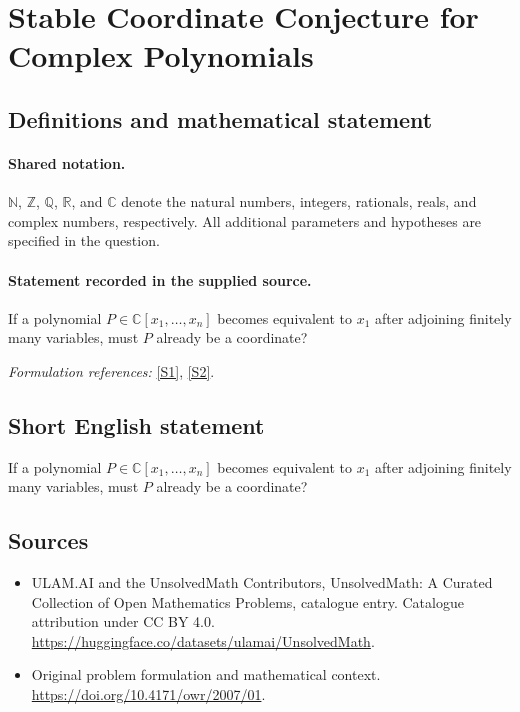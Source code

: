 \documentclass[11pt]{article}
\newcommand{\sref}[2]{\hyperlink{source:#1:#2}{[S#2]}}
\begin{document}
\section{Stable Coordinate Conjecture for Complex Polynomials}\label{statement}

\subsection{Definitions and mathematical statement}

\paragraph{Shared notation.}$\mathbb N$, $\mathbb Z$, $\mathbb Q$, $\mathbb R$, and $\mathbb C$ denote the natural numbers, integers, rationals, reals, and complex numbers, respectively. All additional parameters and hypotheses are specified in the question.


\paragraph{Statement recorded in the supplied source.}
If a polynomial $P\in\mathbb{C}[x_1,\ldots,x_n]$ becomes equivalent to $x_1$ after adjoining finitely many variables, must $P$ already be a coordinate?
\par\smallskip\textit{Formulation references:} \sref{statement}{1}, \sref{statement}{2}.
\subsection{Short English statement}
If a polynomial $P\in\mathbb{C}[x_1,\ldots,x_n]$ becomes equivalent to $x_1$ after adjoining finitely many variables, must $P$ already be a coordinate?
\subsection{Sources}
\begin{itemize}
\item[\hypertarget{source:statement:1}{S1}] ULAM.AI and the UnsolvedMath Contributors, UnsolvedMath: A Curated Collection of Open Mathematics Problems, catalogue entry. Catalogue attribution under CC BY 4.0.
\url{https://huggingface.co/datasets/ulamai/UnsolvedMath}.
\item[\hypertarget{source:statement:2}{S2}] Original problem formulation and mathematical context.
\url{https://doi.org/10.4171/owr/2007/01}.
\end{itemize}
\label{end:statement}
\end{document}
